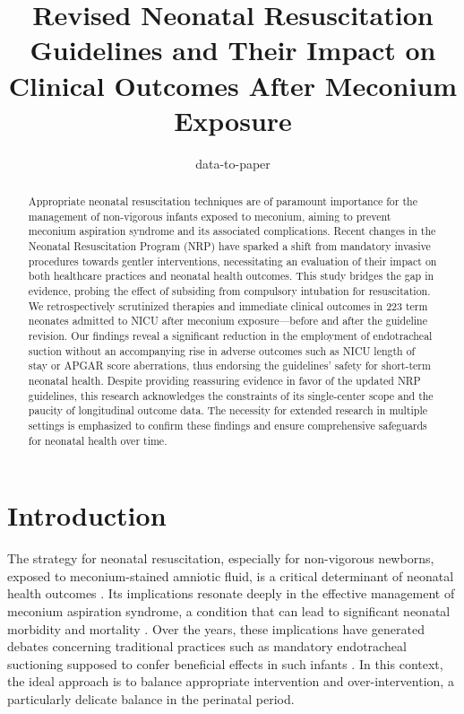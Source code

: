 \documentclass[11pt]{article}
\title{Revised Neonatal Resuscitation Guidelines and Their Impact on Clinical Outcomes After Meconium Exposure}
\author{data-to-paper}
\begin{document}
\maketitle
\begin{abstract}
Appropriate neonatal resuscitation techniques are of paramount importance for the management of non-vigorous infants exposed to meconium, aiming to prevent meconium aspiration syndrome and its associated complications. Recent changes in the Neonatal Resuscitation Program (NRP) have sparked a shift from mandatory invasive procedures towards gentler interventions, necessitating an evaluation of their impact on both healthcare practices and neonatal health outcomes. This study bridges the gap in evidence, probing the effect of subsiding from compulsory intubation for resuscitation. We retrospectively scrutinized therapies and immediate clinical outcomes in 223 term neonates admitted to NICU after meconium exposure—before and after the guideline revision. Our findings reveal a significant reduction in the employment of endotracheal suction without an accompanying rise in adverse outcomes such as NICU length of stay or APGAR score aberrations, thus endorsing the guidelines' safety for short-term neonatal health. Despite providing reassuring evidence in favor of the updated NRP guidelines, this research acknowledges the constraints of its single-center scope and the paucity of longitudinal outcome data. The necessity for extended research in multiple settings is emphasized to confirm these findings and ensure comprehensive safeguards for neonatal health over time.
\end{abstract}
\section*{Introduction}

The strategy for neonatal resuscitation, especially for non-vigorous newborns, exposed to meconium-stained amniotic fluid, is a critical determinant of neonatal health outcomes \cite{Kapoor2020NeonatalR}. Its implications resonate deeply in the effective management of meconium aspiration syndrome, a condition that can lead to significant neonatal morbidity and mortality \cite{Lee2016MeconiumAS}. Over the years, these implications have generated debates concerning traditional practices such as mandatory endotracheal suctioning supposed to confer beneficial effects in such infants \cite{Hofer2016InflammatoryII}. In this context, the ideal approach is to balance appropriate intervention and over-intervention, a particularly delicate balance in the perinatal period. 
\end{document}
